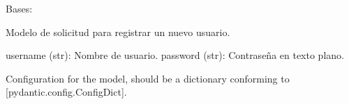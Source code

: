 \documentclass[letterpaper,10pt,spanish]{sphinxmanual}
\begin{document}

\begin{fulllineitems}
\label{\detokenize{endpoints:main.UsuarioRegistro}}
\pysigstartsignatures
\pysiglinewithargsret
{}
{\sphinxparamcomma {}\sphinxparamcomma {}}
{}
\pysigstopsignatures
\sphinxAtStartPar
Bases: 

\sphinxAtStartPar
Modelo de solicitud para registrar un nuevo usuario.
\begin{description}
\sphinxAtStartPar
username (str): Nombre de usuario.
password (str): Contraseña en texto plano.

\end{description}

\begin{fulllineitems}
\label{\detokenize{endpoints:main.UsuarioRegistro.model_config}}
\pysigstartsignatures
\pysigline
{}
\pysigstopsignatures
\sphinxAtStartPar
Configuration for the model, should be a dictionary conforming to {[}\sphinxtitleref{ConfigDict}{]}{[}pydantic.config.ConfigDict{]}.

\end{fulllineitems}


\begin{fulllineitems}
\label{\detokenize{endpoints:main.UsuarioRegistro.password}}
\pysigstartsignatures
\pysigline
{}
\pysigstopsignatures
\end{fulllineitems}


\begin{fulllineitems}
\label{\detokenize{endpoints:main.UsuarioRegistro.username}}
\pysigstartsignatures
\pysigline
{}
\pysigstopsignatures
\end{fulllineitems}


\end{fulllineitems}
\end{document}
